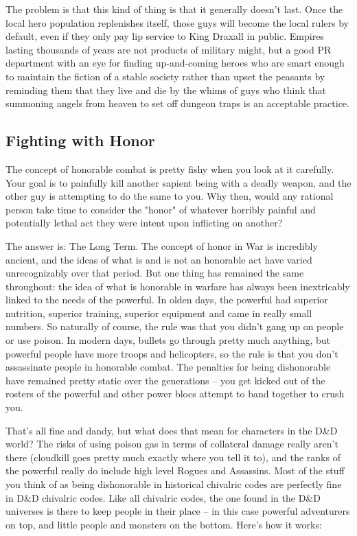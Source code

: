 The problem is that this kind of thing is that it generally doesn't last. Once the local hero population replenishes itself, those guys will become the local rulers by default, even if they only pay lip service to King Draxall in public. Empires lasting thousands of years are not products of military might, but a good PR department with an eye for finding up-and-coming heroes who are smart enough to maintain the fiction of a stable society rather than upset the peasants by reminding them that they live and die by the whims of guys who think that summoning angels from heaven to set off dungeon traps is an acceptable practice.

\subsection{Fighting with Honor}
\vspace*{-8pt}

The concept of honorable combat is pretty fishy when you look at it carefully. Your goal is to painfully kill another sapient being with a deadly weapon, and the other guy is attempting to do the same to you. Why then, would any rational person take time to consider the "honor" of whatever horribly painful and potentially lethal act they were intent upon inflicting on another?

The answer is: The Long Term. The concept of honor in War is incredibly ancient, and the ideas of what is and is not an honorable act have varied unrecognizably over that period. But one thing has remained the same throughout: the idea of what is honorable in warfare has always been inextricably linked to the needs of the powerful. In olden days, the powerful had superior nutrition, superior training, superior equipment and came in really small numbers. So naturally of course, the rule was that you didn't gang up on people or use poison. In modern days, bullets go through pretty much anything, but powerful people have more troops and helicopters, so the rule is that you don't assassinate people in honorable combat. The penalties for being dishonorable have remained pretty static over the generations -- you get kicked out of the rosters of the powerful and other power blocs attempt to band together to crush you.

That's all fine and dandy, but what does that mean for characters in the D\&D world? The risks of using poison gas in terms of collateral damage really aren't there (cloudkill goes pretty much exactly where you tell it to), and the ranks of the powerful really do include high level Rogues and Assassins. Most of the stuff you think of as being dishonorable in historical chivalric codes are perfectly fine in D\&D chivalric codes. Like all chivalric codes, the one found in the D\&D universes is there to keep people in their place -- in this case powerful adventurers on top, and little people and monsters on the bottom. Here's how it works:


